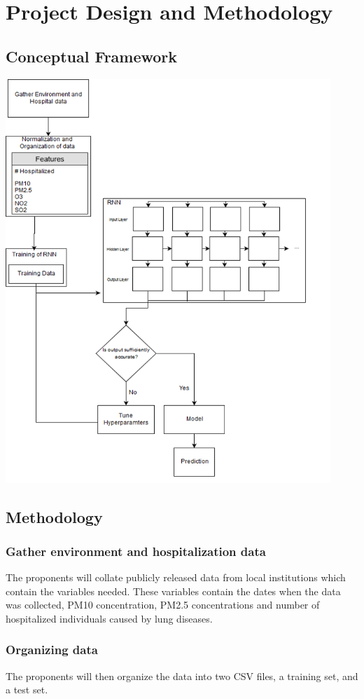 \documentclass[10pt,11pt,12pt,oneside]{book}
\begin{document}
\chapter{Project Design and Methodology}
\section{Conceptual Framework}
\includegraphics[height=6in]{conframework.png}
\section{Methodology}
    \subsection{Gather environment and hospitalization data}
    The proponents will collate publicly released data from local institutions which contain the variables needed. These variables contain the dates when the data was collected, PM10 concentration, PM2.5 concentrations and number of hospitalized individuals caused by lung diseases. 
    \subsection{Organizing data}
    The proponents will then organize the data into two CSV files, a training set, and a test set.
\end{document}
